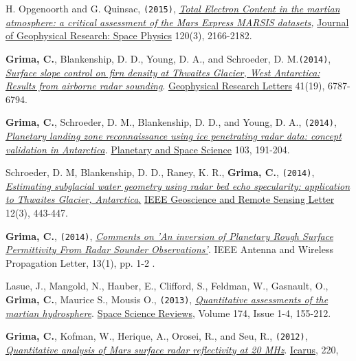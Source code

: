 \begin{etaremune}
  H. Opgenoorth and G. Quinsac, \texttt{(2015)},
  \emph{\href{http://onlinelibrary.wiley.com/doi/10.1002/2014JA020630/abstract}{Total
  Electron Content in the martian atmosphere: a critical assessment of
  the Mars Express MARSIS datasets},} \ul{Journal of Geophysical Research:
  Space Physics} 120(3), 2166-2182.
\item
  \textbf{Grima, C.}, Blankenship, D. D., Young, D. A., and Schroeder,
  D. M.\texttt{(2014)},
  \href{http://onlinelibrary.wiley.com/enhanced/doi/10.1002/2014GL061635/}{\emph{Surface
  slope control on firn density at Thwaites Glacier, West Antarctica:
  Results from airborne radar sounding}}. \ul{Geophysical Research Letters}
  41(19), 6787-6794.
\item
  \textbf{Grima, C.}, Schroeder, D. M., Blankenship, D. D., and Young,
  D. A., \texttt{(2014)},
  \href{http://www.sciencedirect.com/science/article/pii/S0032063314002244}{\emph{Planetary
  landing zone reconnaissance using ice penetrating radar data: concept
  validation in Antarctica}}. \ul{Planetary and Space Science} 103, 191-204.
\item
  Schroeder, D. M, Blankenship, D. D., Raney, K. R., \textbf{Grima, C.},
  \texttt{(2014)},
  \href{http://ieeexplore.ieee.org/xpl/login.jsp?tp=\&arnumber=6901268\&url=http\%3A\%2F\%2Fieeexplore.ieee.org\%2Fstamp\%2Fstamp.jsp\%3Ftp\%3D\%26arnumber\%3D6901268}{\emph{Estimating
  subglacial water geometry using radar bed echo specularity:
  application to Thwaites Glacier, Antarctica}.} \ul{IEEE Geoscience and
  Remote Sensing Letter} 12(3), 443-447.
\item
  \textbf{Grima, C.}, \texttt{(2014)}, \emph{\href{http://ieeexplore.ieee.org/xpl/articleDetails.jsp?tp=\&arnumber=6827185\&queryText\%3Dgrima}{Comments on 'An inversion of Planetary Rough Surface Permittivity From Radar Sounder Observations'}}. IEEE Antenna and Wireless Propagation Letter, 13(1), pp. 1-2 .
\item
  Lasue, J., Mangold, N., Hauber, E., Clifford, S., Feldman, W.,
  Gasnault, O., \textbf{Grima, C.}, Maurice S., Mousis O.,
  \texttt{(2013)},
  \emph{\href{http://www.ig.utexas.edu/pubs/scripts/readpdf.php?contrib=2628}{Quantitative
  assessments of the martian hydrosphere}}. \ul{Space Science Reviews},
  Volume 174, Issue 1-4, 155-212.
\item
  \textbf{Grima, C.}, Kofman, W., Herique, A., Orosei, R., and Seu, R.,
  \texttt{(2012)},
  \href{http://www.sciencedirect.com/science/article/pii/S0019103512001558}{\emph{Quantitative
  analysis of Mars surface radar reflectivity at 20 MHz}}. \ul{Icarus}, 220,

\end{etaremune}
